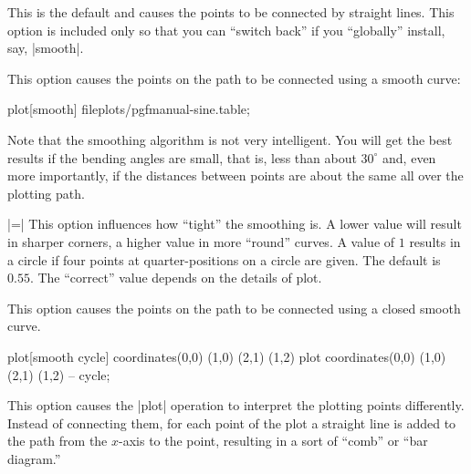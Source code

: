 \begin{itemize}
  This is the default and causes the points to be connected by
  straight lines. This option is included only so that you can
  ``switch back'' if you ``globally'' install, say, |smooth|.
  
  This option causes the points on the path to be connected using a
  smooth curve:

\begin{codeexample}[]
\tikz\draw plot[smooth] file{plots/pgfmanual-sine.table};
\end{codeexample}

  Note that the smoothing algorithm is not very intelligent. You will
  get the best results if the bending angles are small, that is, less
  than about $30^\circ$ and, even more importantly, if the distances
  between points are about the same all over the plotting path.

  |=|
  This option influences how ``tight'' the smoothing is. A lower value
  will result in sharper corners, a higher value in more ``round''
  curves. A value of $1$ results in a circle if four points at
  quarter-positions on a circle are given. The default is $0.55$. The
  ``correct'' value depends on the details of plot.
  
\begin{codeexample}[]
\end{codeexample}
  
  This option causes the points on the path to be connected using a
  closed smooth curve. 

\begin{codeexample}[]
\tikz[scale=0.5]
  \draw plot[smooth cycle] coordinates{(0,0) (1,0) (2,1) (1,2)}
        plot               coordinates{(0,0) (1,0) (2,1) (1,2)} -- cycle;
\end{codeexample}

  This option causes the |plot| operation to interpret the plotting
  points differently. Instead of connecting them, for each point of
  the plot a straight line is added to the path from the $x$-axis to the point,
  resulting in a sort of ``comb'' or ``bar diagram.''


\end{itemize}
